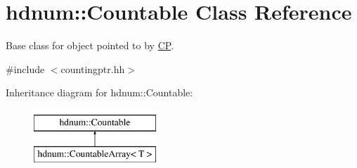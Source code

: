\hypertarget{classhdnum_1_1Countable}{
\section{hdnum::Countable Class Reference}
\label{classhdnum_1_1Countable}
}


Base class for object pointed to by \hyperlink{classhdnum_1_1CP}{CP}.  




{\ttfamily \#include $<$countingptr.hh$>$}

Inheritance diagram for hdnum::Countable:\begin{figure}[H]
\begin{center}
\leavevmode
\includegraphics[height=2cm]{classhdnum_1_1Countable}
\end{center}
\end{figure}
